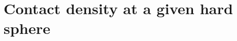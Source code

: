 \documentclass[letterpaper,twocolumn,amsmath,amssymb,jcp,10pt,aip]{revtex4-1}
\begin{document}
  

\section{Contact density at a given hard
  sphere}\label{contact-at-sphere}
\end{document}
